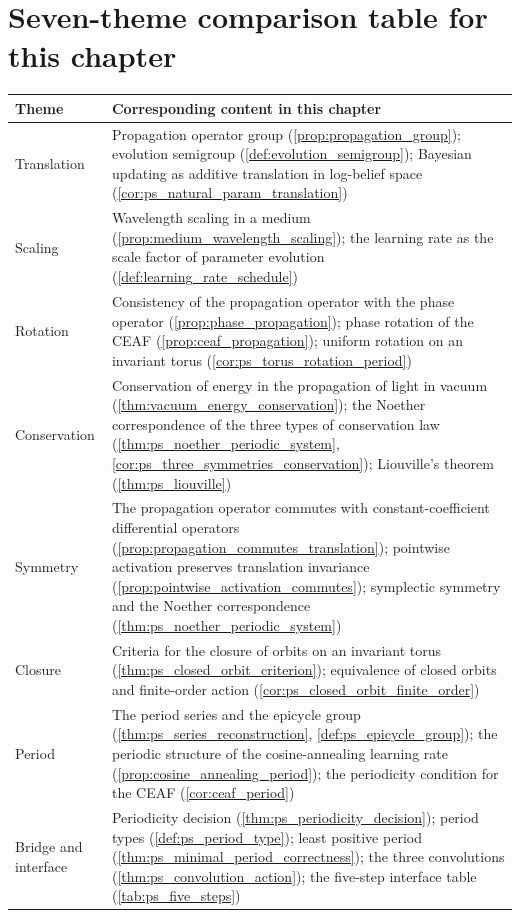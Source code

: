 \section*{Seven-theme comparison table for this chapter}

\begin{center}
\renewcommand{\arraystretch}{1.3}
\begin{tabularx}{\linewidth}{@{}>{\raggedright\arraybackslash\hspace{0pt}}p{2.8cm} >{\raggedright\arraybackslash\hspace{0pt}}X@{}}
\toprule
Theme & Corresponding content in this chapter \\
\midrule
Translation & Propagation operator group (\cref{prop:propagation_group}); evolution semigroup (\cref{def:evolution_semigroup}); Bayesian updating as additive translation in log-belief space (\cref{cor:ps_natural_param_translation}) \\
Scaling & Wavelength scaling in a medium (\cref{prop:medium_wavelength_scaling}); the learning rate as the scale factor of parameter evolution (\cref{def:learning_rate_schedule}) \\
Rotation & Consistency of the propagation operator with the phase operator (\cref{prop:phase_propagation}); phase rotation of the CEAF (\cref{prop:ceaf_propagation}); uniform rotation on an invariant torus (\cref{cor:ps_torus_rotation_period}) \\
Conservation & Conservation of energy in the propagation of light in vacuum (\cref{thm:vacuum_energy_conservation}); the Noether correspondence of the three types of conservation law (\cref{thm:ps_noether_periodic_system}, \cref{cor:ps_three_symmetries_conservation}); Liouville's theorem (\cref{thm:ps_liouville}) \\
Symmetry & The propagation operator commutes with constant-coefficient differential operators (\cref{prop:propagation_commutes_translation}); pointwise activation preserves translation invariance (\cref{prop:pointwise_activation_commutes}); symplectic symmetry and the Noether correspondence (\cref{thm:ps_noether_periodic_system}) \\
Closure & Criteria for the closure of orbits on an invariant torus (\cref{thm:ps_closed_orbit_criterion}); equivalence of closed orbits and finite-order action (\cref{cor:ps_closed_orbit_finite_order}) \\
Period & The period series and the epicycle group (\cref{thm:ps_series_reconstruction}, \cref{def:ps_epicycle_group}); the periodic structure of the cosine-annealing learning rate (\cref{prop:cosine_annealing_period}); the periodicity condition for the CEAF (\cref{cor:ceaf_period}) \\
Bridge and interface & Periodicity decision (\cref{thm:ps_periodicity_decision}); period types (\cref{def:ps_period_type}); least positive period (\cref{thm:ps_minimal_period_correctness}); the three convolutions (\cref{thm:ps_convolution_action}); the five-step interface table (\cref{tab:ps_five_steps}) \\
\bottomrule
\end{tabularx}
\end{center}

